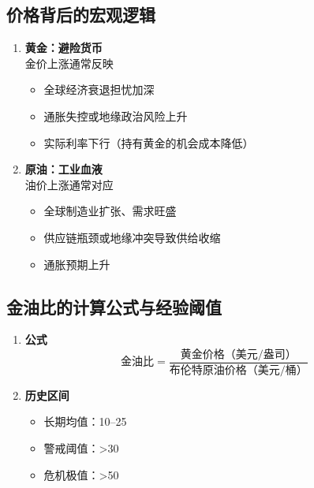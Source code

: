 \subsection{价格背后的宏观逻辑}
\begin{enumerate}[leftmargin=*, nosep]
    \item \textbf{黄金：避险货币}  \\
    金价上涨通常反映  
    \begin{itemize}[nosep]  
        \item 全球经济衰退担忧加深  
        \item 通胀失控或地缘政治风险上升  
        \item 实际利率下行（持有黄金的机会成本降低）
    \end{itemize}
    
    \item \textbf{原油：工业血液}  \\
    油价上涨通常对应  
    \begin{itemize}[nosep]  
        \item 全球制造业扩张、需求旺盛  
        \item 供应链瓶颈或地缘冲突导致供给收缩  
        \item 通胀预期上升
    \end{itemize}
\end{enumerate}

\subsection{金油比的计算公式与经验阈值}
\begin{enumerate}[leftmargin=*, nosep]
    \item \textbf{公式}  
    \[
    \text{金油比} = \frac{\text{黄金价格（美元/盎司）}}{\text{布伦特原油价格（美元/桶）}}
    \]

    \item \textbf{历史区间}  
    \begin{itemize}[nosep]  
        \item 长期均值：10–25  
        \item 警戒阈值：>30  
        \item 危机极值：>50
    \end{itemize}
\end{enumerate}

